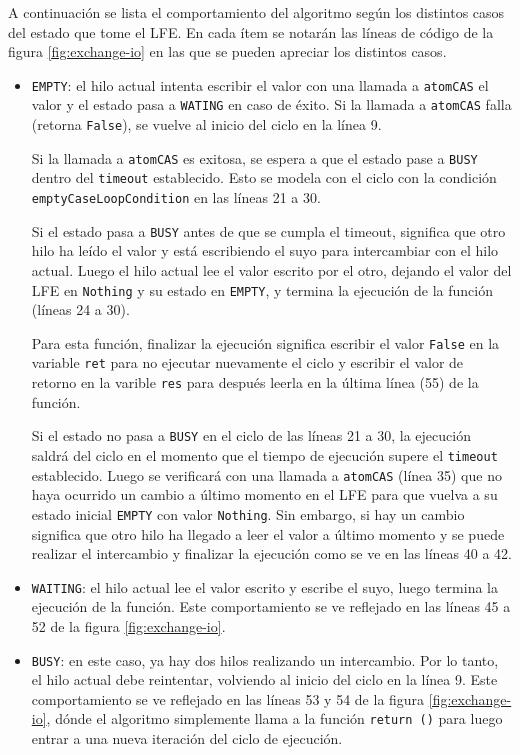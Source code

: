A continuación se lista el comportamiento del algoritmo según los distintos casos del estado que tome el LFE. En cada ítem se notarán las líneas de código de la figura \ref{fig:exchange-io} en las que se pueden apreciar los distintos casos.

\begin{itemize}
\item{
\texttt{EMPTY}: el hilo actual intenta escribir el valor con una llamada a \texttt{atomCAS} el valor y el estado pasa a \texttt{WATING} en caso de éxito. Si la llamada a \texttt{atomCAS} falla (retorna \texttt{False}), se vuelve al inicio del ciclo en la línea 9.

Si la llamada a \texttt{atomCAS} es exitosa, se espera a que el estado pase a \texttt{BUSY} dentro del \texttt{timeout} establecido. Esto se modela con el ciclo con la condición \texttt{emptyCaseLoopCondition} en las líneas 21 a 30.

Si el estado pasa a \texttt{BUSY} antes de que se cumpla el timeout, significa que otro hilo ha leído el valor y está escribiendo el suyo para intercambiar con el hilo actual. Luego el hilo actual lee el valor escrito por el otro, dejando el valor del LFE en \texttt{Nothing} y su estado en \texttt{EMPTY}, y termina la ejecución de la función (líneas 24 a 30).} Para esta función, finalizar la ejecución significa escribir el valor \texttt{False} en la variable \texttt{ret} para no ejecutar nuevamente el ciclo y escribir el valor de retorno en la varible \texttt{res} para después leerla en la última línea (55) de la función.

Si el estado no pasa a \texttt{BUSY} en el ciclo de las líneas 21 a 30, la ejecución saldrá del ciclo en el momento que el tiempo de ejecución supere el \texttt{timeout} establecido. Luego se verificará con una llamada a \texttt{atomCAS} (línea 35) que no haya ocurrido un cambio a último momento en el LFE para que vuelva a su estado inicial \texttt{EMPTY} con valor \texttt{Nothing}. Sin embargo, si hay un cambio significa que otro hilo ha llegado a leer el valor a último momento y se puede realizar el intercambio y finalizar la ejecución como se ve en las líneas 40 a 42.


\item{\texttt{WAITING}: el hilo actual lee el valor escrito y escribe el suyo, luego termina la ejecución de la función. Este comportamiento se ve reflejado en las líneas 45 a 52 de la figura \ref{fig:exchange-io}.}
\item{\texttt{BUSY}: en este caso, ya hay dos hilos realizando un intercambio. Por lo tanto, el hilo actual debe reintentar, volviendo al inicio del ciclo en la línea 9. Este comportamiento se ve reflejado en las líneas 53 y 54 de la figura \ref{fig:exchange-io}, dónde el algoritmo simplemente llama a la función \texttt{return ()} para luego entrar a una nueva iteración del ciclo de ejecución.}
\end{itemize}

